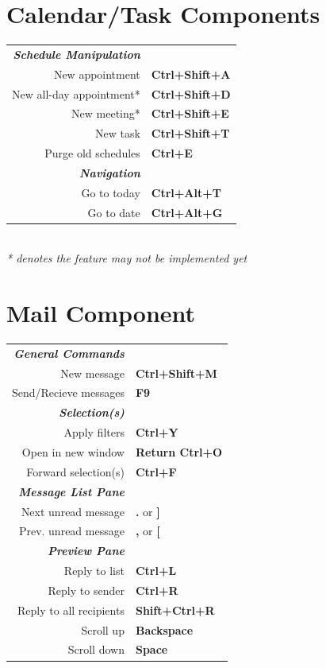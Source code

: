 \documentclass[12pt]{article}
\begin{document}
\begin{landscape}
\begin{center}
\begin{multicols}{2}
	\section*{Calendar/Task Components}
	\begin{tabular*}{4in}{rp{1.5in}}
		\textit{\textbf{Schedule Manipulation}}	&					\\
		New appointment				& \textbf{Ctrl+Shift+A}			\\
		New all-day appointment*		& \textbf{Ctrl+Shift+D}			\\
		New meeting*				& \textbf{Ctrl+Shift+E}			\\
		New task				& \textbf{Ctrl+Shift+T}			\\
		\vspace{1.5mm}
		Purge old schedules			& \textbf{Ctrl+E}			\\
		\textit{\textbf{Navigation}}		&					\\
		Go to today				& \textbf{Ctrl+Alt+T}			\\
		Go to date				& \textbf{Ctrl+Alt+G}			\\
	\end{tabular*}
	{\\ \vspace{5mm} \footnotesize \textit{* denotes the feature may not be implemented yet}}
	\section*{Mail Component}
	\begin{tabular*}{4in}{rp{1.5in}}
		\textit{\textbf{General Commands}}	&				\\
		New message				& \textbf{Ctrl+Shift+M}		\\
		\vspace{1.5mm}
		Send/Recieve messages			& \textbf{F9}			\\
		\textit{\textbf{Selection(s)}}		&				\\
		Apply filters				& \textbf{Ctrl+Y}		\\
		Open in new window 			& \textbf{Return Ctrl+O}	\\
		\vspace{1.5mm}
		Forward selection(s)			& \textbf{Ctrl+F}		\\
		\textit{\textbf{Message List Pane}}	&				\\
		Next unread message			& \textbf{.} or \textbf{]}	\\
		\vspace{1.5mm}
		Prev. unread message			& \textbf{,} or \textbf{[}	\\
		\textit{\textbf{Preview Pane}}		&				\\
		Reply to list				& \textbf{Ctrl+L}		\\
		Reply to sender				& \textbf{Ctrl+R}		\\
		Reply to all recipients 		& \textbf{Shift+Ctrl+R}		\\
		Scroll up				& \textbf{Backspace}		\\
		Scroll down				& \textbf{Space}		\\
	\end{tabular*}

\end{multicols}
\end{center}
\end{landscape}
\end{document}

